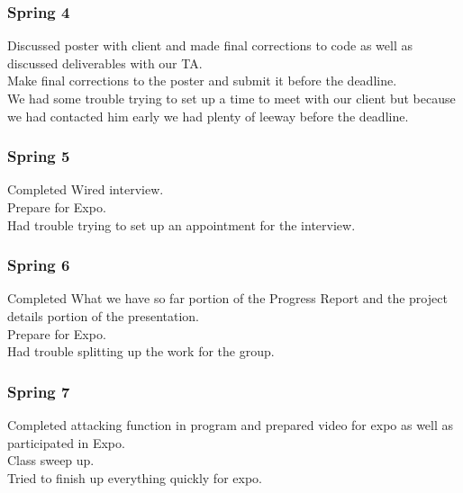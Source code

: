 \subsubsection{Spring 4}
Discussed poster with client and made final corrections to code as well as discussed deliverables with our TA.\\ Make final corrections to the poster and submit it before the deadline.\\ We had some trouble trying to set up a time to meet with our client but because we had contacted him early we had plenty of leeway before the deadline.\\

\subsubsection{Spring 5}
Completed Wired interview.\\ Prepare for Expo.\\ Had trouble trying to set up an appointment for the interview.\\

\subsubsection{Spring 6}
Completed What we have so far portion of the Progress Report and the project details portion of the presentation.\\ Prepare for Expo.\\ Had trouble splitting up the work for the group.\\

\subsubsection{Spring 7}
Completed attacking function in program and prepared video for expo as well as participated in Expo.\\ Class sweep up.\\ Tried to finish up everything quickly for expo.\\

